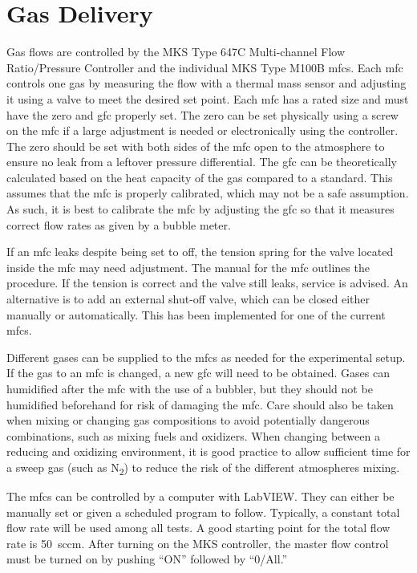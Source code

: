 \section{Gas Delivery}
    Gas flows are controlled by the MKS Type 647C Multi-channel Flow Ratio/Pressure Controller and the individual MKS Type M100B \glspl{mfc}.
    Each \gls{mfc} controls one gas by measuring the flow with a thermal mass sensor and adjusting it using a valve to meet the desired set point.
    Each \gls{mfc} has a rated size and must have the zero and \gls{gfc} properly set.
    The zero can be set physically using a screw on the \gls{mfc} if a large adjustment is needed or electronically using the controller.
    The zero should be set with both sides of the \gls{mfc} open to the atmosphere to ensure no leak from a leftover pressure differential.
    The \gls{gfc} can be theoretically calculated based on the heat capacity of the gas compared to a standard.
    This assumes that the \gls{mfc} is properly calibrated, which may not be a safe assumption.
    As such, it is best to calibrate the \gls{mfc} by adjusting the \gls{gfc} so that it measures correct flow rates as given by a bubble meter.

    If an \gls{mfc} leaks despite being set to off, the tension spring for the valve located inside the \gls{mfc} may need adjustment.
    The manual for the \gls{mfc} outlines the procedure.
    If the tension is correct and the valve still leaks, service is advised.
    An alternative is to add an external shut-off valve, which can be closed either manually or automatically.
    This has been implemented for one of the current \glspl{mfc}.

    Different gases can be supplied to the \glspl{mfc} as needed for the experimental setup.
    If the gas to an \gls{mfc} is changed, a new \gls{gfc} will need to be obtained.
    Gases can humidified after the \gls{mfc} with the use of a bubbler, but they should not be humidified beforehand for risk of damaging the \gls{mfc}.
    Care should also be taken when mixing or changing gas compositions to avoid potentially dangerous combinations, such as mixing fuels and oxidizers.
    When changing between a reducing and oxidizing environment, it is good practice to allow sufficient time for a sweep gas (such as N\textsubscript{2}) to reduce the risk of the different atmospheres mixing.

    The \glspl{mfc} can be controlled by a computer with LabVIEW.
    They can either be manually set or given a scheduled program to follow.
    Typically, a constant total flow rate will be used among all tests.
    A good starting point for the total flow rate is \SI{50}{sccm}.
    After turning on the MKS controller, the master flow control must be turned on by pushing ``ON'' followed by ``0/All.''

